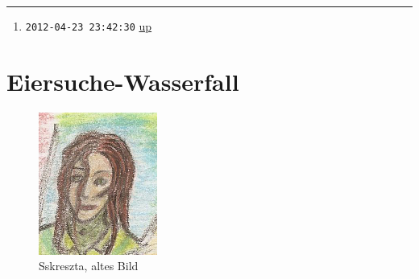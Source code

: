 \documentclass[11pt]{scrartcl}
\begin{document}
\begin{center}\rule{3in}{0.4pt}\end{center}

\begin{enumerate}
\item
  \texttt{2012-04-23 23:42:30}
  \href{http://1w6.org/print/book/export/html/59\#fnref:datum}{up}
\end{enumerate}
\section{Eiersuche-Wasserfall}

\begin{figure}[htbp]
\centering
\includegraphics{sskreszta-portrait-alt-klein.png}
\caption{Sskreszta, altes Bild}
\end{figure}
\end{document}
